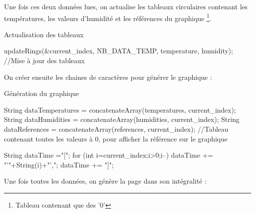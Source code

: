 Une fois ces deux données lues, on actualise les tableaux circulaires contenant les températures, les valeurs d'humidité et les références du graphique \footnote{Tableau contenant que des '0'}.

\begin{Cpp}{Actualisation des tableaux}

    updateRings(&current_index, NB_DATA_TEMP, temperature, humidity); //Mise à jour des tableaux

\end{Cpp}

On créer ensuite les chaines de caractères pour générer le graphique :

\begin{Cpp}{Génération du graphique}

    String dataTemperatures = concatenateArray(temperatures, current_index);
    String dataHumidities = concatenateArray(humidities, current_index);
    String dataReferences = concatenateArray(references, current_index); //Tableau contenant toutes les valeurs à 0, pour afficher la référence sur le graphique
    
    String dataTime ="[";
    for (int i=current_index;i>0;i--) {
      dataTime += "'"+String(i)+"',";
    }
    dataTime += "]";

\end{Cpp}

Une fois toutes les données, on génère la page dans son intégralité :


